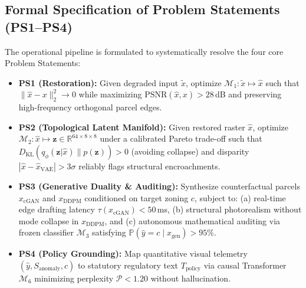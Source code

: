 \documentclass[journal]{IEEEtran}
\begin{document}
\subsection{Formal Specification of Problem Statements (PS1--PS4)}
The operational pipeline is formulated to systematically resolve the four core Problem Statements:
\begin{itemize}
    \item \textbf{PS1 (Restoration):} Given degraded input $\tilde{x}$, optimize $\mathcal{M}_1: \tilde{x} \mapsto \hat{x}$ such that $\|\hat{x} - x\|_2^2 \to 0$ while maximizing $\text{PSNR}(\hat{x}, x) > 28$\,dB and preserving high-frequency orthogonal parcel edges.
    \item \textbf{PS2 (Topological Latent Manifold):} Given restored raster $\hat{x}$, optimize $\mathcal{M}_2: \hat{x} \mapsto \mathbf{z} \in \mathbb{R}^{64 \times 8 \times 8}$ under a calibrated Pareto trade-off such that $D_{\text{KL}}(q_\phi(\mathbf{z}|\hat{x}) \| p(\mathbf{z})) > 0$ (avoiding collapse) and disparity $|\hat{x} - \hat{x}_{\text{VAE}}| > 3\sigma$ reliably flags structural encroachments.
    \item \textbf{PS3 (Generative Duality \& Auditing):} Synthesize counterfactual parcels $x_{\text{cGAN}}$ and $x_{\text{DDPM}}$ conditioned on target zoning $c$, subject to: (a) real-time edge drafting latency $\tau(x_{\text{cGAN}}) < 50$\,ms, (b) structural photorealism without mode collapse in $x_{\text{DDPM}}$, and (c) autonomous mathematical auditing via frozen classifier $\mathcal{M}_3$ satisfying $\mathbb{P}(\hat{y} = c \mid x_{\text{gen}}) > 95\%$.
    \item \textbf{PS4 (Policy Grounding):} Map quantitative visual telemetry $(\hat{y}, S_{\text{anomaly}}, c)$ to statutory regulatory text $T_{\text{policy}}$ via causal Transformer $\mathcal{M}_6$ minimizing perplexity $\mathcal{P} < 1.20$ without hallucination.
\end{itemize}
\end{document}
